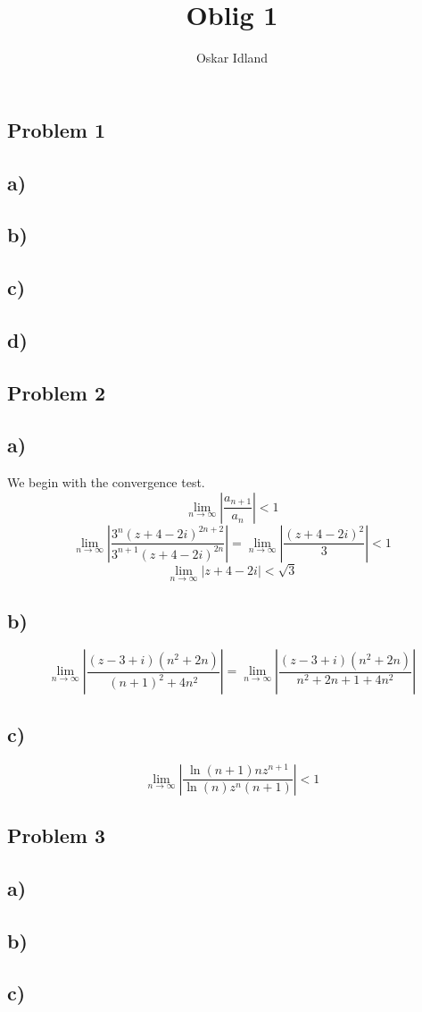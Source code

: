 \documentclass{article}
\author{Oskar Idland}
\title{Oblig 1}
\date{}
\begin{document}
\maketitle
\newpage

\subsection*{Problem 1}
\subsection*{a)}

\subsection*{b)}

\subsection*{c)}

\subsection*{d)}




\subsection*{Problem 2}
\subsection*{a)}
We begin with the convergence test. 
\[
\lim_{n \to ∞}\left|\frac{a_{n+1}}{a_n}\right| < 1
\]
\[
\lim_{n \to ∞} \left|\frac{3^{n}(z+4-2i)^{2n + 2}}{3^{n+1}(z+4-2i)^{2n}}\right| = \lim_{n \to ∞} \left|\frac{(z+4-2i)^2}{3}\right| < 1
\]
\[
\lim_{n \to ∞} \left|z + 4 - 2i\right| < \sqrt{3}
\]

\subsection*{b)}
\[
\lim_{n \to ∞} \left|\frac{\left(z-3+i\right)(n^2 + 2n)}{(n+1)^2 + 4n^2}\right| = \lim_{n \to ∞} \left|\frac{(z-3+i)(n^2 + 2n)}{n^2 + 2n + 1 + 4n^2}\right|
\]

\subsection*{c)}
\[
\lim_{n \to ∞} \left|\frac{\ln (n+1)nz^{n+1}}{\ln (n)z^{n}(n+1)}\right| < 1
\]




\subsection*{Problem 3}
\subsection*{a)}

\subsection*{b)}

\subsection*{c)}
\end{document}
